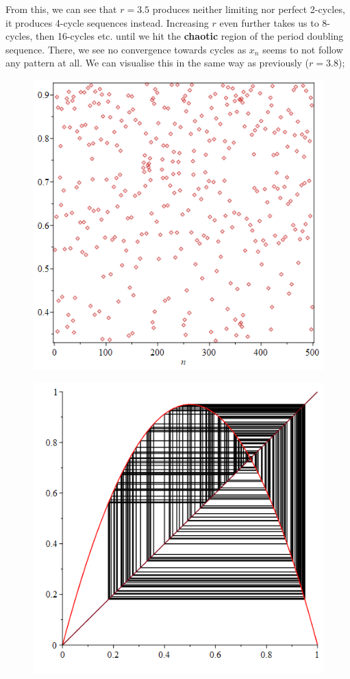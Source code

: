 \documentclass[12pt]{article}
\begin{document}
From this, we can see that $r=3.5$ produces neither limiting nor perfect 2-cycles, it produces 4-cycle sequences instead. Increasing $r$ even further takes us to 8-cycles, then 16-cycles etc. until we hit the \textbf{chaotic} region of the period doubling sequence. There, we see no convergence towards cycles as $x_n$ seems to not follow any pattern at all. We can visualise this in the same way as previously ($r=3.8$);
\begin{figure}[H]
	\centering
	\hfill
	\begin{minipage}{.45\textwidth}
		\centering
		\includegraphics[scale=0.34]{per3p8.png}
		\label{fig:test1}
	\end{minipage}%
	\hfill
	\begin{minipage}{.45\textwidth}
		\centering
		\includegraphics[scale=0.34]{per3p8Cob.png}

\end{minipage}
\end{figure}
\end{document}
